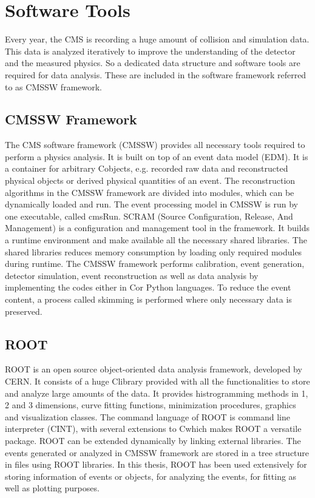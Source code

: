 \section{Software Tools}
Every year, the CMS is recording a huge amount of collision and simulation data. This data is analyzed iteratively to improve the understanding of the detector and the measured physics. So a dedicated data structure and software tools are required for data analysis. These are included in the software framework referred to as CMSSW framework.

\subsection{CMSSW Framework}
The CMS software framework (CMSSW) \cite{CMS:2005aa} provides all necessary tools required to perform a physics analysis. It is built on top of an event data model (EDM). It is a container for arbitrary C\plusn\plus objects, e.g. recorded raw data and reconstructed physical objects or derived physical quantities of an event. The reconstruction algorithms in the CMSSW framework are divided into modules, which can be dynamically loaded and run. The event processing model in CMSSW is run by one executable, called cmsRun. SCRAM (Source Configuration, Release, And Management) is a configuration and management tool in the framework. It builds a runtime environment and make available all the necessary shared libraries. The shared libraries reduces memory consumption by loading only required modules during runtime. The CMSSW framework performs calibration, event generation, detector simulation, event reconstruction as well as data analysis by implementing the codes either in C\plusn\plus or Python languages. To reduce the event content, a process called skimming is performed where only necessary data is preserved. 

\subsection{ROOT}
ROOT \cite{Brun:1997pa} is an open source object-oriented data analysis framework, developed by CERN. It consists of a huge C\plusn\plus library provided with all the functionalities to store and analyze large amounts of the data. It provides histrogramming methods in 1, 2 and 3 dimensions, curve fitting functions, minimization procedures, graphics and visualization classes. The command language of ROOT is command line interpreter (CINT), with several extensions to C\plusn\plus which makes ROOT a versatile package. ROOT can be extended dynamically by linking external libraries. The events generated or analyzed in CMSSW framework are stored in a tree structure in files using ROOT libraries. In this thesis, ROOT has been used extensively for storing information of events or objects, for analyzing the events, for fitting as well as plotting purposes.

